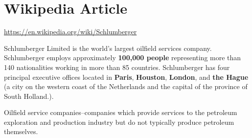 \documentclass[12pt,a4paper]{article}
\begin{document}
\section{Wikipedia Article}

\url{https://en.wikipedia.org/wiki/Schlumberger}

Schlumberger Limited is the world's largest oilfield services company.
Schlumberger employs approximately \textbf{100,000 people} representing more
than 140 nationalities working in more than 85 countries. Schlumberger has
four principal executive offices located in \textbf{Paris},
\textbf{Houston}, \textbf{London}, and \textbf{the Hague} (a city on the
western coast of the Netherlands and the capital of the province of South
Holland.).

Oilfield service companies--companies which provide services to the
petroleum exploration and production industry but do not typically produce
petroleum themselves. 
\end{document}
